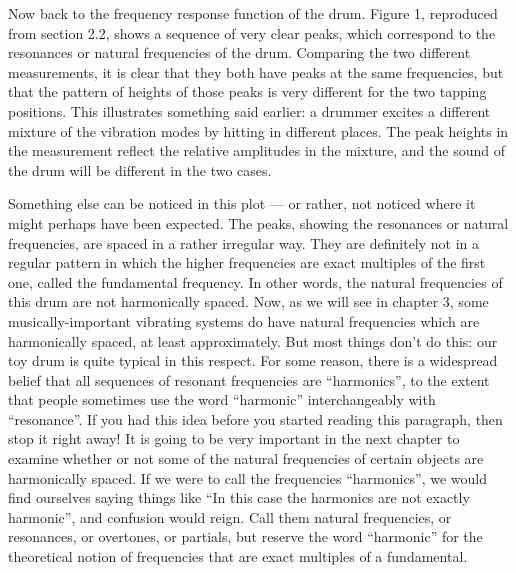 

  Now back to the frequency response function of the drum. Figure 1, reproduced 
  from section 2.2, shows a sequence of very clear peaks, which correspond to 
  the resonances or natural frequencies of the drum. Comparing the two 
  different measurements, it is clear that they both have peaks at the same 
  frequencies, but that the pattern of heights of those peaks is very different 
  for the two tapping positions. This illustrates something said earlier: a 
  drummer excites a different mixture of the vibration modes by hitting in 
  different places. The peak heights in the measurement reflect the relative 
  amplitudes in the mixture, and the sound of the drum will be different in the 
  two cases. 


  Something else can be noticed in this plot --- or rather, not noticed where 
  it might perhaps have been expected. The peaks, showing the resonances or 
  natural frequencies, are spaced in a rather irregular way. They are 
  definitely not in a regular pattern in which the higher frequencies are exact 
  multiples of the first one, called the fundamental frequency. In other words, 
  the natural frequencies of this drum are not harmonically spaced. Now, as we 
  will see in chapter 3, some musically-important vibrating systems do have 
  natural frequencies which are harmonically spaced, at least approximately. 
  But most things don't do this: our toy drum is quite typical in this respect. 
  For some reason, there is a widespread belief that all sequences of resonant 
  frequencies are ``harmonics'', to the extent that people sometimes use the 
  word ``harmonic'' interchangeably with ``resonance''. If you had this idea 
  before you started reading this paragraph, then stop it right away! It is 
  going to be very important in the next chapter to examine whether or not some 
  of the natural frequencies of certain objects are harmonically spaced. If we 
  were to call the frequencies ``harmonics'', we would find ourselves saying 
  things like ``In this case the harmonics are not exactly harmonic'', and 
  confusion would reign. Call them natural frequencies, or resonances, or 
  overtones, or partials, but reserve the word ``harmonic'' for the theoretical 
  notion of frequencies that are exact multiples of a fundamental. 

